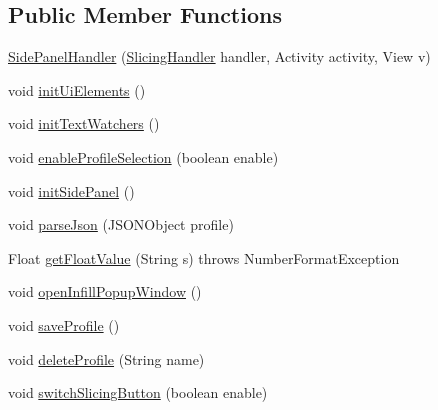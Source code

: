 \subsection*{Public Member Functions}
\begin{DoxyCompactItemize}
\item 
\hyperlink{classandroid_1_1app_1_1printerapp_1_1viewer_1_1sidepanel_1_1_side_panel_handler_ac7b08334541f2f2dcf2d97e86cf782de}{Side\+Panel\+Handler} (\hyperlink{classandroid_1_1app_1_1printerapp_1_1viewer_1_1_slicing_handler}{Slicing\+Handler} handler, Activity activity, View v)
\item 
void \hyperlink{classandroid_1_1app_1_1printerapp_1_1viewer_1_1sidepanel_1_1_side_panel_handler_aab8ee13a91df27a2a36898a0c416d78c}{init\+Ui\+Elements} ()
\item 
void \hyperlink{classandroid_1_1app_1_1printerapp_1_1viewer_1_1sidepanel_1_1_side_panel_handler_a75367f767b553f18033a46ff9990d41b}{init\+Text\+Watchers} ()
\item 
void \hyperlink{classandroid_1_1app_1_1printerapp_1_1viewer_1_1sidepanel_1_1_side_panel_handler_ac4b2a6f77e6952c172f56d94e16661e7}{enable\+Profile\+Selection} (boolean enable)
\item 
void \hyperlink{classandroid_1_1app_1_1printerapp_1_1viewer_1_1sidepanel_1_1_side_panel_handler_a7e33fec3936ef15cb531dd761786e73b}{init\+Side\+Panel} ()
\item 
void \hyperlink{classandroid_1_1app_1_1printerapp_1_1viewer_1_1sidepanel_1_1_side_panel_handler_afcfb262bd85106cdb9bb4d282c0bc3a7}{parse\+Json} (J\+S\+O\+N\+Object profile)
\item 
Float \hyperlink{classandroid_1_1app_1_1printerapp_1_1viewer_1_1sidepanel_1_1_side_panel_handler_a7f2e9cc648086002ec1c64a74e1bbf46}{get\+Float\+Value} (String s)  throws Number\+Format\+Exception 
\item 
void \hyperlink{classandroid_1_1app_1_1printerapp_1_1viewer_1_1sidepanel_1_1_side_panel_handler_a3df603bc7191014d4537af740732361e}{open\+Infill\+Popup\+Window} ()
\item 
void \hyperlink{classandroid_1_1app_1_1printerapp_1_1viewer_1_1sidepanel_1_1_side_panel_handler_adddfb5e09a776f96cec3f50d1f3afe6f}{save\+Profile} ()
\item 
void \hyperlink{classandroid_1_1app_1_1printerapp_1_1viewer_1_1sidepanel_1_1_side_panel_handler_a0e7a91bfb969581b2e67a925f81b9651}{delete\+Profile} (String name)
\item 
void \hyperlink{classandroid_1_1app_1_1printerapp_1_1viewer_1_1sidepanel_1_1_side_panel_handler_a5109dd831f904f15ed67596f7af472a2}{switch\+Slicing\+Button} (boolean enable)

\end{DoxyCompactItemize}

